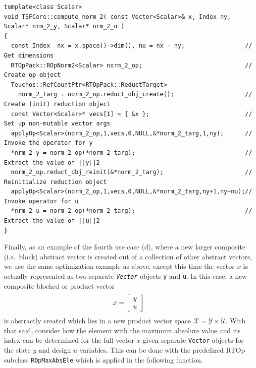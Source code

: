 {\scriptsize\begin{verbatim}
template<class Scalar>
void TSFCore::compute_norm_2( const Vector<Scalar>& x, Index ny, Scalar* nrm_2_y, Scalar* nrm_2_u )
{
  const Index  nx = x.space()->dim(), nu = nx - ny;                 // Get dimensions
  RTOpPack::ROpNorm2<Scalar> norm_2_op;                             // Create op object
  Teuchos::RefCountPtr<RTOpPack::ReductTarget>
    norm_2_targ = norm_2_op.reduct_obj_create();                    // Create (init) reduction object
  const Vector<Scalar>* vecs[1] = { &x };                           // Set up non-mutable vector args
  applyOp<Scalar>(norm_2_op,1,vecs,0,NULL,&*norm_2_targ,1,ny);      // Invoke the operator for y
  *nrm_2_y = norm_2_op(*norm_2_targ);                               // Extract the value of ||y||2
  norm_2_op.reduct_obj_reinit(&*norm_2_targ);                       // Reinitialize reduction object
  applyOp<Scalar>(norm_2_op,1,vecs,0,NULL,&*norm_2_targ,ny+1,ny+nu);// Invoke operator for u
  *nrm_2_u = norm_2_op(*norm_2_targ);                               // Extract the value of ||u||2
}
\end{verbatim}}

{}\noindent{}Finally, as an example of the fourth use case (d), where
a new larger composite (i.e.~block) abstract vector is created out of
a collection of other abstract vectors, we use the same optimization
example as above, except this time the vector $x$ is actually
represented as two separate {}\texttt{\textit{Vector}} objects
{}\texttt{y} and {}\texttt{u}.  In this case, a new composite blocked
or product vector
%
\[
x = {\bmat{c} y \\ u \emat}
\]
%
is abstractly created which lies in a new product vector space
$\mathcal{X} = \mathcal{Y} \times \mathcal{U}$.  With that said,
consider how the element with the maximum absolute value and its index
can be determined for the full vector $x$ given separate
{}\texttt{Vector} objects for the state $y$ and design $u$ variables.
This can be done with the predefined RTOp subclass
{}\texttt{ROpMax\-AbsEle} which is applied in the following function.

